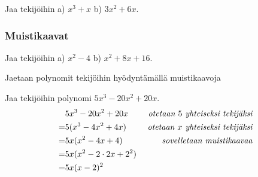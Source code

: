 \begin{esimerkki}
Jaa tekijöihin \quad a) $x^3+x$ \quad b) $3x^2+6x.$
\begin{alakohdat}
\end{alakohdat}
\end{esimerkki}

\subsubsection*{Muistikaavat}

\begin{esimerkki}
Jaa tekijöihin \quad a) $x^2-4$ \quad b) $x^2+8x+16.$
	\begin{esimratk}
Jaetaan polynomit tekijöihin hyödyntämällä muistikaavoja
\begin{alakohdat}
\end{alakohdat}
	\end{esimratk}
\end{esimerkki}

\begin{esimerkki}
Jaa tekijöihin polynomi $5x^3-20x^2+20x$.
\begin{align*}
& 5x^3-20x^2+20x \ \ \ \ &\emph{otetaan $5$ yhteiseksi tekijäksi}\\
=& 5(x^3-4x^2+4x)&\emph{otetaan $x$ yhteiseksi tekijäksi}  \\
=& 5x(x^2-4x+4) &\emph{sovelletaan muistikaavaa} \\
=& 5x(x^2-2\cdot 2x+2^2)  \\
=& 5x(x-2)^2
\end{align*}
\end{esimerkki}


